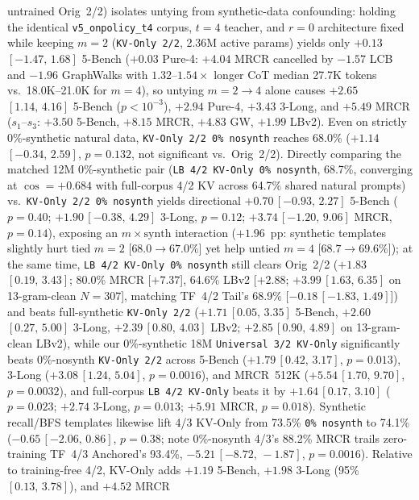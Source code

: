 \documentclass[11pt]{article}
\newcommand{\ci}[2]{\,{\scriptsize\ensuremath{[#1,\,#2]}}}
\begin{document}
\begin{enumerate}
untrained Orig~2/2) isolates untying from synthetic-data confounding: holding the identical \texttt{v5\_onpolicy\_t4}
corpus, $t{=}4$ teacher, and $r{=}0$ architecture fixed while keeping $m{=}2$ (\texttt{KV-Only~2/2}, 2.36M active
params) yields only $+0.13$\ci{-1.47}{1.68} 5-Bench ($+0.03$ Pure-4: $+4.04$ MRCR cancelled by $-1.57$ LCB and $-1.96$
GraphWalks with $1.32$--$1.54\times$ longer CoT median 27.7K tokens vs.\ 18.0K--21.0K for $m{=}4$), so untying
$m{=}2\to4$ alone causes $+2.65$\ci{1.14}{4.16} 5-Bench ($p{<}10^{-3}$), $+2.94$ Pure-4, $+3.43$ 3-Long, and $+5.49$
MRCR ($s_1$--$s_3$: $+3.50$ 5-Bench, $+8.15$ MRCR, $+4.83$ GW, $+1.99$ LBv2). Even on strictly 0\%-synthetic natural data, \texttt{KV-Only~2/2 0\% nosynth} reaches 68.0\% ($+1.14$\ci{-0.34}{2.59},
$p{=}0.132$, not significant vs.\ Orig~2/2). Directly comparing the matched 12M 0\%-synthetic pair
(\texttt{LB~4/2~KV-Only 0\% nosynth}, 68.7\%, converging at $\cos{=}{+}0.684$ with full-corpus 4/2 KV across 64.7\%
shared natural prompts) vs.\ \texttt{KV-Only~2/2 0\% nosynth} yields directional $+0.70$\ci{-0.93}{2.27} 5-Bench
($p{=}0.40$; $+1.90$\ci{-0.38}{4.29} 3-Long, $p{=}0.12$; $+3.74$\ci{-1.20}{9.06} MRCR, $p{=}0.14$), exposing an
$m{\times}\text{synth}$ interaction ($+1.96$~pp: synthetic templates slightly hurt tied $m{=}2$ [$68.0\to 67.0\%$] yet
help untied $m{=}4$ [$68.7\to 69.6\%$]); at the same time, \texttt{LB~4/2~KV-Only 0\% nosynth} still clears Orig~2/2
($+1.83$\ci{0.19}{3.43}; 80.0\% MRCR [$+7.37$], 64.6\% LBv2 [$+2.88$; $+3.99$\ci{1.63}{6.35} on 13-gram-clean
$N{=}307$], matching TF~4/2 Tail's 68.9\% [$-0.18$\ci{-1.83}{1.49}]) and beats full-synthetic \texttt{KV-Only~2/2}
($+1.71$\ci{0.05}{3.35} 5-Bench, $+2.60$\ci{0.27}{5.00} 3-Long, $+2.39$\ci{0.80}{4.03} LBv2; $+2.85$\ci{0.90}{4.89} on
13-gram-clean LBv2), while our 0\%-synthetic 18M \texttt{Universal~3/2 KV-Only} significantly beats 0\%-nosynth
\texttt{KV-Only~2/2} across 5-Bench ($+1.79$\ci{0.42}{3.17}, $p{=}0.013$), 3-Long ($+3.08$\ci{1.24}{5.04},
$p{=}0.0016$), and MRCR~512K ($+5.54$\ci{1.70}{9.70}, $p{=}0.0032$), and full-corpus \texttt{LB~4/2~KV-Only} beats it
by $+1.64$\ci{0.17}{3.10} ($p{=}0.023$; $+2.74$ 3-Long, $p{=}0.013$; $+5.91$ MRCR, $p{=}0.018$). Synthetic recall/BFS
templates likewise lift 4/3 KV-Only from 73.5\% \texttt{0\% nosynth} to 74.1\% ($-0.65$\ci{-2.06}{0.86}, $p{=}0.38$;
note 0\%-nosynth 4/3's 88.2\% MRCR trails zero-training TF~4/3 Anchored's 93.4\%, $-5.21$\ci{-8.72}{-1.87},
$p{=}0.0016$).
Relative to training-free 4/2, KV-Only adds $+1.19$ 5-Bench, $+1.98$ 3-Long (95\% \ci{0.13}{3.78}), and $+4.52$ MRCR

\end{enumerate}
\end{document}
